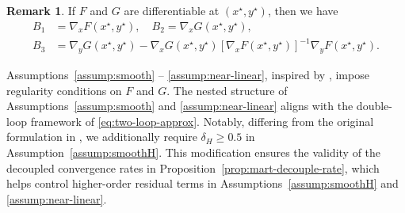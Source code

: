 \documentclass[11pt]{article}
\theoremstyle{plain}
\theoremstyle{definition}
\newtheorem{rema}{Remark}[section]
\def\Hsmooth{{\delta_H}}
\begin{document}
\begin{rema}\label{remar:fclt:B-form}
	If $F$ and $G$ are differentiable at $(x^\star, y^\star)$,
	then we have
	\begin{align*}
		B_1 & = \nabla_x F(x^{\star}, y^{\star}), \quad
		B_2 =  \nabla_x G(x^{\star}, y^{\star}), \\
		B_3 & = \nabla_y G(x^{\star}, y^{\star}) - \nabla_x G(x^{\star}, y^{\star}) [\nabla_x F(x^{\star}, y^{\star})]^{-1} \nabla_y F(x^{\star}, y^{\star}).
	\end{align*}
\end{rema}

Assumptions~\ref{assump:smooth} -- \ref{assump:near-linear}, inspired by \cite{han2024finite}, impose regularity conditions on $F$ and $G$.
The nested structure of Assumptions~\ref{assump:smooth} and \ref{assump:near-linear} aligns with the double-loop framework of \eqref{eq:two-loop-approx}.
Notably, differing from the original formulation in \cite{han2024finite}, we additionally require $\Hsmooth \ge 0.5$ in Assumption~\ref{assump:smoothH}.
This modification ensures the validity of the decoupled convergence rates in Proposition~\ref{prop:mart-decouple-rate}, which helps control higher-order residual terms in Assumptions~\ref{assump:smoothH} and \ref{assump:near-linear}.






\end{document}
